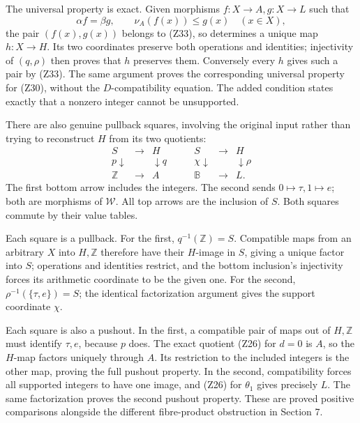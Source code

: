 \documentclass[
]{article}
\begin{document}
The universal property is exact. Given morphisms \(f:X\to A,g:X\to L\)
such that \[
\alpha f=\beta g,\qquad \nu_A(f(x))\le g(x)\quad(x\in X),
\] the pair \((f(x),g(x))\) belongs to (Z33), so determines a unique map
\(h:X\to H\). Its two coordinates preserve both operations and
identities; injectivity of \((q,\rho)\) then proves that \(h\) preserves
them. Conversely every \(h\) gives such a pair by (Z33). The same
argument proves the corresponding universal property for (Z30), without
the \(D\)-compatibility equation. The added condition states exactly
that a nonzero integer cannot be unsupported.

There are also genuine pullback squares, involving the original input
rather than trying to reconstruct \(H\) from its two quotients: \[
\begin{array}{ccc}
S&\longrightarrow&H\\
p\downarrow&&\downarrow q\\
\mathbb Z&\longrightarrow&A
\end{array}
\qquad
\begin{array}{ccc}
S&\longrightarrow&H\\
\chi\downarrow&&\downarrow\rho\\
\mathbb B&\longrightarrow&L .
\end{array}
\tag{Z34}
\] The first bottom arrow includes the integers. The second sends
\(0\mapsto\tau,1\mapsto e\); both are morphisms of \(\mathcal W\). All
top arrows are the inclusion of \(S\). Both squares commute by their
value tables.

Each square is a pullback. For the first, \(q^{-1}(\mathbb Z)=S\).
Compatible maps from an arbitrary \(X\) into \(H,\mathbb Z\) therefore
have their \(H\)-image in \(S\), giving a unique factor into \(S\);
operations and identities restrict, and the bottom inclusion's
injectivity forces its arithmetic coordinate to be the given one. For
the second, \(\rho^{-1}(\{\tau,e\})=S\); the identical factorization
argument gives the support coordinate \(\chi\).

Each square is also a pushout. In the first, a compatible pair of maps
out of \(H,\mathbb Z\) must identify \(\tau,e\), because \(p\) does. The
exact quotient (Z26) for \(d=0\) is \(A\), so the \(H\)-map factors
uniquely through \(A\). Its restriction to the included integers is the
other map, proving the full pushout property. In the second,
compatibility forces all supported integers to have one image, and (Z26)
for \(\theta_1\) gives precisely \(L\). The same factorization proves
the second pushout property. These are proved positive comparisons
alongside the different fibre-product obstruction in Section 7.
\end{document}

